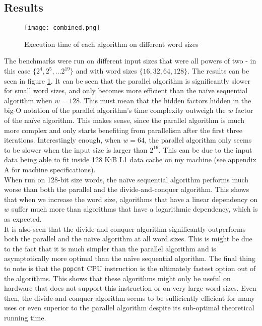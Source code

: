 \subsection{Results}
\begin{figure}
    \centering
    \texttt{[image: combined.png]}
    \caption{Execution time of each algorithm on different word sizes}
    \label{fig:runningtime}
\end{figure}
The benchmarks were run on different input sizes that were all powers of two - in this case $\{2^4, 2^5, \dots 2^{19}\}$ and with word sizes $\{16, 32, 64, 128\}$. The results can be seen in figure \ref{fig:runningtime}. 
It can be seen that the parallel algorithm is significantly slower for small word sizes, and only becomes more efficient than the naïve sequential algorithm when $w=128$. This must mean that the hidden factors hidden in the big-O notation of the parallel algorithm's time complexity outweigh the $w$ factor of the naïve algorithm. This makes sense, since the parallel algorithm is much more complex and only starts benefiting from parallelism after the first three iterations. Interestingly enough, when $w=64$, the parallel algorithm only seems to be slower when the input size is larger than $2^{16}$. This can be due to the input data being able to fit inside 128 KiB L1 data cache on my machine (see appendix A for machine specifications).\\
When run on 128-bit size words, the naïve sequential algorithm performs much worse than both the parallel and the divide-and-conquer algorithm. This shows that when we increase the word size, algorithms that have a linear dependency on $w$ suffer much more than algorithms that have a logarithmic dependency, which is as expected.\\
It is also seen that the divide and conquer algorithm significantly outperforms both the parallel and the naïve algorithm at all word sizes. This is might be due to the fact that it is much simpler than the parallel algorithm and is asymptotically more optimal than the naïve sequential algorithm.
The final thing to note is that the \texttt{popcnt} CPU instruction is the ultimately fastest option out of the algorithms. This shows that these algorithms might only be useful on hardware that does not support this instruction or on very large word sizes. Even then, the divide-and-conquer algorithm seems to be sufficiently efficient for many uses or even superior to the parallel algorithm despite its sub-optimal theoretical running time.\\

